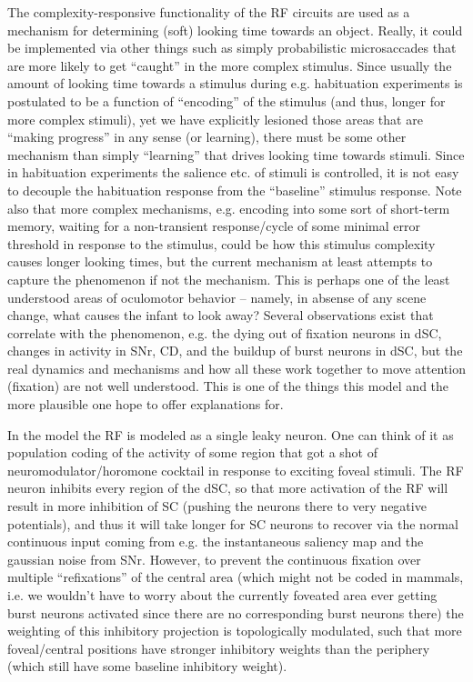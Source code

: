 \documentclass[12pt]{article}
\begin{document}
The complexity-responsive functionality of the RF circuits are used as
a mechanism for determining (soft) looking time towards an
object. Really, it could be implemented via other things such as
simply probabilistic microsaccades that are more likely to get
``caught'' in the more complex stimulus. Since usually the amount of
looking time towards a stimulus during e.g. habituation experiments is
postulated to be a function of ``encoding'' of the stimulus (and thus,
longer for more complex stimuli), yet we have explicitly lesioned
those areas that are ``making progress'' in any sense (or learning),
there must be some other mechanism than simply ``learning'' that
drives looking time towards stimuli. Since in habituation experiments
the salience etc. of stimuli is controlled, it is not easy to decouple
the habituation response from the ``baseline'' stimulus response. Note
also that more complex mechanisms, e.g. encoding into some sort of
short-term memory, waiting for a non-transient response/cycle of some
minimal error threshold in response to the stimulus, could be how this
stimulus complexity causes longer looking times, but the current
mechanism at least attempts to capture the phenomenon if not the
mechanism. This is perhaps one of the least understood areas of
oculomotor behavior -- namely, in absense of any scene change, what
causes the infant to look away? Several observations exist that
correlate with the phenomenon, e.g. the dying out of fixation neurons
in dSC, changes in activity in SNr, CD, and the buildup of burst
neurons in dSC, but the real dynamics and mechanisms and how all these
work together to move attention (fixation) are not well
understood. This is one of the things this model and the more
plausible one hope to offer explanations for.

In the model the RF is modeled as a single leaky neuron. One can think
of it as population coding of the activity of some region that got a
shot of neuromodulator/horomone cocktail in response to exciting
foveal stimuli. The RF neuron inhibits every region of the dSC, so
that more activation of the RF will result in more inhibition of SC
(pushing the neurons there to very negative potentials), and thus it
will take longer for SC neurons to recover via the normal continuous
input coming from e.g. the instantaneous saliency map and the gaussian
noise from SNr. However, to prevent the continuous fixation over
multiple ``refixations'' of the central area (which might not be coded
in mammals, i.e. we wouldn't have to worry about the currently
foveated area ever getting burst neurons activated since there are no
corresponding burst neurons there) the weighting of this inhibitory
projection is topologically modulated, such that more foveal/central
positions have stronger inhibitory weights than the periphery (which
still have some baseline inhibitory weight).
\end{document}

